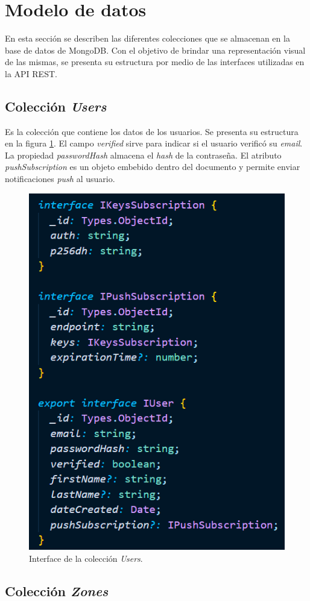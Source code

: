 \section{Modelo de datos}

En esta sección se describen las diferentes colecciones que se almacenan en la base de datos de MongoDB. Con el objetivo de brindar una representación visual de las mismas, se presenta su estructura por medio de las interfaces utilizadas en la API REST.

\subsection{Colección \textit{Users}}

Es la colección que contiene los datos de los usuarios. Se presenta su estructura en la figura \ref{fig:coleccionUsers}. El campo \textit{verified} sirve para indicar si el usuario verificó su \textit{email}. La propiedad \textit{passwordHash} almacena el \emph{hash} de la contraseña. El atributo \textit{pushSubscription} es un objeto embebido dentro del documento y permite enviar notificaciones \emph{push} al usuario. 

\begin{figure}[H]
	\centering
	\includegraphics[width=.5\textwidth]{./Figures/Coleccion Users.png}
	\caption{Interface de la colección \textit{Users}.}
	\label{fig:coleccionUsers}
\end{figure}

\subsection{Colección \textit{Zones}}

